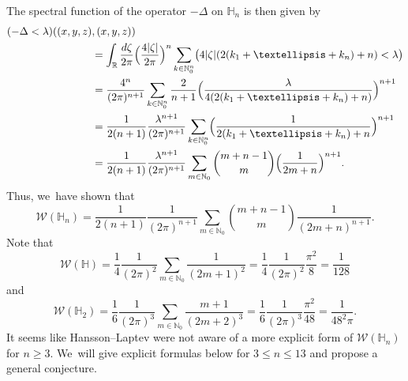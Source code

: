 \documentclass[11pt]{article}
\theoremstyle{definition}
\newcommand{\1}{\mathbbm{1}}
\newcommand{\N}{\mathbb{N}}
\newcommand{\R}{\mathbb{R}}
\numberwithin{equation}{section}
\begin{document}
The spectral function of the operator $-\Delta$ on $\mathbb H_n$ is then given by
\begin{align*}
\1(-\Delta<\lambda)((x,y,z)&,(x,y,z)) \\
& = \int_\R \frac{d\zeta}{2\pi} \Bigl(\frac{4|\zeta|}{2\pi}\Bigr)^n \sum_{k \in\N_0^n} \1\bigl(4|\zeta|(2(k_1+\ldots+k_n)+n)<\lambda\bigr) \\
& = \frac{4^n}{(2\pi)^{n+1}} \sum_{k\in\N_0^n} \frac{2}{n+1} \Bigl(\frac{\lambda}{4(2(k_1+\ldots+k_n)+n)}\Bigr)^{n+1} \\
& = \frac{1}{2(n+1)} \frac{\lambda^{n+1}}{(2\pi)^{n+1}} \sum_{k\in\N_0^n} \Bigl(\frac{1}{2(k_1+\ldots+k_n)+n}\Bigr)^{n+1} \\
& = \frac{1}{2(n+1)} \frac{\lambda^{n+1}}{(2\pi)^{n+1}} \sum_{m\in\N_0} \binom{m+n-1}{m} \Bigl(\frac{1}{2m+n}\Bigr)^{n+1}.
\end{align*}
Thus, we~have shown that
\begin{equation}\label{w4}
\mathcal W(\mathbb H_n) = \frac{1}{2(n+1)} \frac{1}{(2\pi)^{n+1}} \sum_{m\in\N_0} \binom{m+n-1}{m} \frac{1}{(2m+n)^{n+1}}.
\end{equation}
Note that
\begin{equation}\label{eq:W1}
\mathcal W(\mathbb H) = \frac{1}{4} \frac{1}{(2\pi)^2} \sum_{m\in\N_0} \frac{1}{(2m+1)^2} = \frac14 \frac1{(2\pi)^2} \frac{\pi^2}8 = \frac1{128}
\end{equation}
and
\begin{equation}\label{eq:W2}
\mathcal W(\mathbb H_2) = \frac{1}{6} \frac{1}{(2\pi)^3} \sum_{m\in\N_0} \frac{m+1}{(2m+2)^3} = \frac{1}{6} \frac{1}{(2\pi)^3} \frac{\pi^2}{48} = \frac{1}{48^2 \pi}.
\end{equation}
It seems like Hansson--Laptev \cite{HL} were not aware of a more explicit form of $\mathcal W(\mathbb H_n)$ for $n\geq 3$. We~will give explicit formulas below for $3\leq n \leq 13$ and propose a general conjecture.
\end{document}
